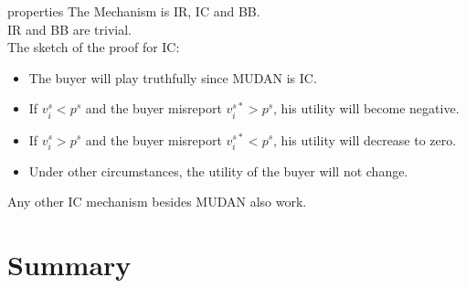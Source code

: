 \documentclass{beamer}
\begin{document}
\begin{frame}{properties}
	The Mechanism is IR, IC and BB.\\ \pause
	IR and BB are trivial.\\
	The sketch of the proof for IC:
	\begin{itemize}
		\item The buyer will play truthfully since MUDAN is IC.
		\item If \(v^s_i < p^s\) and the buyer misreport \(v^{s*}_i > p^s\), his utility will become negative.
		\item If \(v^s_i > p^s\) and the buyer misreport \(v^{s*}_i < p^s\), his utility will decrease to zero.
		\item Under other circumstances, the utility of the buyer will not change.
	\end{itemize}
	\pause
	Any other IC mechanism besides MUDAN also work.
\end{frame}

\section{Summary}
\end{document}
